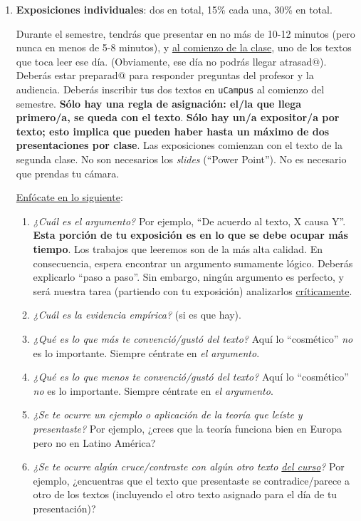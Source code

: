 \documentclass[letterpaper]{article}
\begin{document}
\begin{enumerate}
	\item {\bf Exposiciones individuales}: dos en total, 15\% cada una, 30\% en total.

	Durante el semestre, tendr\'as que presentar en no m\'as de 10-12 minutos (pero nunca en menos de 5-8 minutos), y \underline{al comienzo de la clase}, uno de los textos que toca leer ese d\'ia. (Obviamente, ese d\'ia no podr\'as llegar atrasad$@$). Deber\'as estar preparad$@$ para responder preguntas del profesor y la audiencia. Deber\'as inscribir tus dos textos en \texttt{uCampus} al comienzo del semestre. {\bf S\'olo hay una regla de asignaci\'on: el/la que llega primero/a, se queda con el texto}. {\bf S\'olo hay un/a expositor/a por texto; esto implica que pueden haber hasta un m\'aximo de dos presentaciones por clase}. Las exposiciones comienzan con el texto de la segunda clase. No son necesarios los \emph{slides} (``Power Point''). No es necesario que prendas tu c\'amara.

	\underline{Enf\'ocate en lo siguiente}:

		\begin{enumerate}
			\item \emph{¿Cu\'al es el argumento?} Por ejemplo, ``De acuerdo al texto, X causa Y''. {\bf Esta porci\'on de tu exposici\'on es en lo que se debe ocupar m\'as tiempo}. Los trabajos que leeremos son de la m\'as alta calidad. En consecuencia, espera encontrar un argumento sumamente l\'ogico. Deber\'as explicarlo ``paso a paso''. Sin embargo, ning\'un argumento es perfecto, y ser\'a nuestra tarea (partiendo con tu exposici\'on) analizarlos \underline{cr\'iticamente}. 
			\item \emph{¿Cu\'al es la evidencia emp\'irica?} (si es que hay).
			\item \emph{¿Qu\'e es lo que m\'as te convenci\'o/gust\'o del texto?} Aqu\'i lo ``cosm\'etico'' \emph{no} es lo importante. Siempre c\'entrate en \emph{el argumento}.
			\item \emph{¿Qu\'e es lo que menos te convenci\'o/gust\'o del texto?} Aqu\'i lo ``cosm\'etico'' \emph{no} es lo importante. Siempre c\'entrate en \emph{el argumento}.
			\item \emph{¿Se te ocurre un ejemplo o aplicaci\'on de la teor\'ia que le\'iste y presentaste?} Por ejemplo, ¿crees que la teor\'ia funciona bien en Europa pero no en Latino Am\'erica?
			\item \emph{¿Se te ocurre alg\'un cruce/contraste con alg\'un otro texto \underline{del curso}?} Por ejemplo, ¿encuentras que el texto que presentaste se contradice/parece a otro de los textos (incluyendo el otro texto asignado para el d\'ia de tu presentaci\'on)?
		\end{enumerate}

\end{enumerate}
\end{document}
